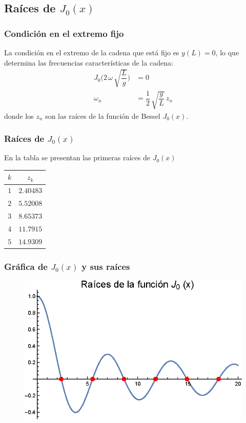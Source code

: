 \documentclass[12pt]{beamer}
\begin{document}
\subsection{Raíces de \texorpdfstring{$J_{0} (x)$}{J0 (x)}}

\begin{frame}
\frametitle{Condición en el extremo fijo}
La condición en el extremo de la cadena que está fijo es $y (L) = 0$, lo que determina las frecuencias características de la cadena:
\pause
\begin{align}
J_{0} \bigg( 2 \, \omega \, \sqrt{\dfrac{L}{g}} \bigg) &= 0 \label{eq:ecuacion_25} \\[0.5em]
\omega_{n} &= \dfrac{1}{2} \, \sqrt{\dfrac{g}{L}} \, z_{n} \label{eq:ecuacion_26}
\end{align}
\pause
donde los $z_{n}$ son las raíces de la función de Bessel $J_{0} (x)$.
\end{frame}
\begin{frame}
\frametitle{Raíces de $J_{0} (x)$}
En la tabla se presentan las primeras raíces de $J_{0} (x)$
\begin{table}[H]
\centering
\large
\renewcommand{\arraystretch}{0.8}
\begin{tabular}{c | c}
$k$ & $z_{k}$ \\ \hline
$1$ & $2.40483$ \\
$2$ & $5.52008$ \\
$3$ & $8.65373$ \\
$4$ & $11.7915$ \\
$5$ & $14.9309$ \\
\end{tabular}
\end{table}
\end{frame}
\begin{frame}
\frametitle{Gráfica de $J_{0} (x)$ y sus raíces}
\begin{figure}[H]
    \centering
    \includegraphics[scale=1]{Imagenes/Plot_Bessel_Cadena_01_Raices_J0.eps}
\end{figure}
\end{frame}
\end{document}
